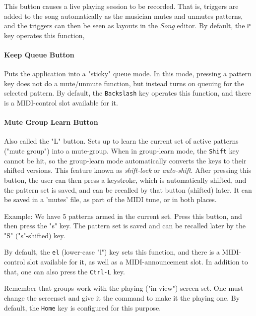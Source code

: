 \documentclass[
 11pt,
 twoside,
 a4paper,
 headinclude,
 footinclude,
 final                                 %
]{article}
\begin{document}
   This button causes a live playing session to be recorded.
   That is, triggers are added to the song automatically as the musician mutes
   and unmutes patterns, and the triggers can then be
   seen as layouts in the \textsl{Song} editor.
   By default, the \texttt{P} key operates this function,

\paragraph{Keep Queue Button}
\label{paragraph:introduction_keep_queue_button}

   Puts the application into a "sticky" queue mode.
   In this mode, pressing a pattern key does not do a mute/unmute function, but
   instead turns on queuing for the selected pattern.
   By default, the \texttt{Backslash} key operates this function,
   and there is a MIDI-control slot available for it.

\paragraph{Mute Group Learn Button}
\label{paragraph:introduction_mute_group_learn_button}

   Also called the "L" button.
   Sets up to learn the current set of active patterns ("mute group") into a
   mute-group.
   When in group-learn mode, the \texttt{Shift} key cannot be hit, so the
   group-learn mode automatically converts the keys to their shifted versions.
   This feature known as \textsl{shift-lock} or \textsl{auto-shift}.
   After pressing this button, the user can then press a keystroke, which is
   automatically shifted, and the pattern set is saved, and can be recalled by
   that button (shifted) later.  It can be saved in a 'mutes' file, as part of the
   MIDI tune, or in both places.

   Example:  We have 5 patterns armed in the current set. Press this button,
   and then press the "s" key.  The pattern set is saved and can be recalled
   later by the "S" ("s"-shifted) key.

   By default, the \texttt{el} (lower-case "l") key sets this function,
   and there is a MIDI-control slot available for it, as well as a
   MIDI-announcement slot.
   In addition to that, one can also press
   the \texttt{Ctrl-L} key.

   Remember that groups work with the playing ("in-view") screen-set.
   One must change the screenset and give it the command to make it the
   playing one.
   By default, the \texttt{Home} key is configured for this purpose.
\end{document}
